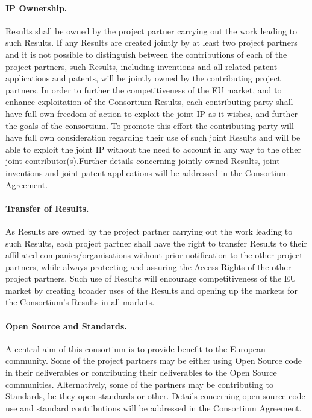 \documentclass[a4paper,11pt]{article}
\begin{document}

\pagebreak
\paragraph{IP Ownership.}

Results shall be owned by the project partner carrying out the work
leading to such Results. If any Results are created jointly by at least
two project partners and it is not possible to distinguish between the
contributions of each of the project partners, such Results, including
inventions and all related patent applications and patents, will be
jointly owned by the contributing project partners. In order to further
the competitiveness of the EU market, and to enhance exploitation of the
Consortium Results, each contributing party shall have full own freedom
of action to exploit the joint IP as it wishes, and further the goals of
the consortium. To promote this effort the contributing party will have
full own consideration regarding their use of such joint Results and will
be able to exploit the joint IP without the need to account in any way to
the other joint contributor(s).Further details concerning jointly owned
Results, joint inventions and joint patent applications will be addressed
in the Consortium Agreement.

\paragraph{Transfer of Results.}

As Results are owned by the project partner carrying out the work leading
to such Results, each project partner shall have the right to transfer
Results to their affiliated companies/organisations without prior notification to the
other project partners, while always protecting and assuring the Access
Rights of the other project partners.  Such use of Results will encourage
competitiveness of the EU market by creating broader uses of the Results
and opening up the markets for the Consortium's Results in all markets.

\paragraph{Open Source and Standards.}

A central aim of this consortium is to provide benefit to the European community.  Some of the project partners may be either using Open Source code in their deliverables or contributing their deliverables to the Open
Source communities. Alternatively, some of the partners may be contributing to Standards, be they open standards or other. Details concerning open source code use and standard contributions will be
addressed in the Consortium Agreement.
\end{document}
